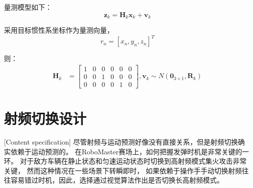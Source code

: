 量测模型如下：\begin{equation} \boldsymbol  z_{k} = \boldsymbol H_k\boldsymbol x_k + \boldsymbol {v}_{k} \end{equation}
\par
采用目标惯性系坐标作为量测向量，\begin{equation} r_n = [x_n,y_n,z_n]^T \end{equation} 
\par
则：
\begin{equation} \begin{aligned} \boldsymbol H_k &=  \left[\begin{array}{cccccc} 1 & 0 &0 &0 &  0 &0   \\ 0 &0 &1 &0 &0 &0 \\ 0 &0 &0 &0 &1 &0  \end{array}\right],\boldsymbol {v}_{k} \sim N\left(\boldsymbol 0_{3 \times 1}, \boldsymbol {R}_k\right) \end{aligned} \end{equation}
\par

\section{射频切换设计}[Content specification]
尽管射频与运动预测好像没有直接关系，但是射频切换确实依赖于运动预测的。
在RoboMaster赛场上，如何把握发弹时机是非常关键的一环。
对于敌方车辆在静止状态和匀速运动状态时切换到高射频模式集火攻击非常关键，
然而这种情况在一些场景下转瞬即时，
如果依赖于操作手手动切换射频往往容易错过时机，因此，选择通过视觉算法作出是否切换长高射频模式。\par

